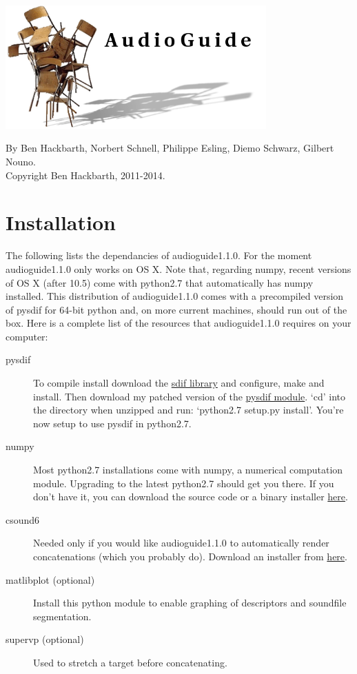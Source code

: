 \documentclass{article}
\newcommand{\ag}{audioguide1.1.0\xspace}
\begin{document}
\setlength{\parskip}{10pt}
\begin{spacing}{1.2}
\begin{center}
\includegraphics[width=0.75\textwidth]{image0.png}

By Ben Hackbarth, Norbert Schnell, Philippe Esling, Diemo Schwarz, Gilbert Nouno. \\
Copyright Ben Hackbarth, 2011-2014.
\end{center}

\tableofcontents


\section{Installation}
The following lists the dependancies of \ag.  For the moment \ag only works on OS X.  Note that, regarding numpy, recent versions of OS X  (after 10.5) come with python2.7 that automatically has numpy installed.  This distribution of \ag comes with a precompiled version of pysdif for 64-bit python and, on more current machines, should run out of the box.  Here is a complete list of the resources that \ag requires on your computer:
\begin{description}
\item[pysdif] To compile install download the \href{http://sourceforge.net/projects/sdif/files/sdif/}{sdif library} and configure, make and install.  Then download my patched version of the \href{http://www.benhackbarth.com/\ag/pysdif-0.1.4-patch.zip}{pysdif module}.  `cd' into the directory when unzipped and run: `python2.7 setup.py install'.  You're now setup to use pysdif in python2.7.
\item[numpy] Most python2.7 installations come with numpy, a numerical computation module.  Upgrading to the latest python2.7 should get you there.  If you don't have it, you can download the source code or a binary installer \href{http://www.scipy.org/install.html}{here}.
\item[csound6] Needed only if you would like \ag to automatically render concatenations (which you probably do).  Download an installer from \href{http://www.csounds.com/downloads}{here}.
\item[matlibplot (optional)] Install this python module to enable graphing of descriptors and soundfile segmentation.
\item[supervp (optional)] Used to stretch a target before concatenating.
\end{description}


\end{spacing}
\end{document}
